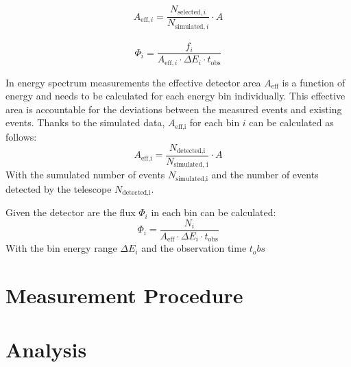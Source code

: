     \begin{equation}
        A_{\text{eff},i} = \frac{N_{\text{selected},i}}{N_{\text{simulated},i}} \cdot A
        \label{eq:acceptance}
    \end{equation}

    \begin{equation}
        \Phi_i = \frac{\hat{f}_i}{A_{\text{eff},i} \cdot \Delta E_i \cdot t_\text{obs}}
        \label{eq:flux}
    \end{equation}

    In energy spectrum measurements the effective detector area $A_\text{eff}$ is a function of energy and needs to be calculated for each energy bin individually.
    This effective area is accountable for the deviations between the measured events and existing events.
    Thanks to the simulated data, $A_\text{eff,i}$ for each bin $i$ can be calculated as follows:
    \begin{equation}
        A_\text{eff,i}=\frac{N_\text{detected,i}}{N_\text{simulated, i}}\cdot A
    \end{equation}
    With the sumulated number of events $N_\text{simulated,i}$ and the number of events detected by the telescope $N_\text{detected,i}$.

    Given the detector are the flux $\Phi_i$ in each bin can be calculated:
    \begin{equation}
        \Phi_i=\frac{N_i}{A_\text{eff} \cdot \Delta E_i \cdot t_\text{obs}}
    \end{equation}
    With the bin energy range $\Delta E_i$ and the observation time $t_obs$
    \section{Measurement Procedure}
    

%
%
    \section{Analysis}
        
